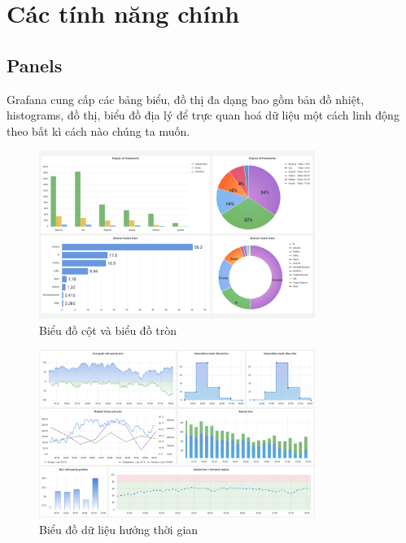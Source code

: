\section{Các tính năng chính}
\subsection{Panels}
Grafana cung cấp các bảng biểu, đồ thị đa dạng bao gồm bản đồ nhiệt, histograms, đồ thị, biểu đồ địa lý để trực quan hoá dữ liệu một cách linh động theo bất kì cách nào chúng ta muốn.
\begin{figure}[H] %
    \centering %
    \includegraphics[width=0.8\textwidth]{figures/bar_chart_and_pie_chart_light_theme_sized.png} 
    \caption{Biểu đồ cột và biểu đồ tròn} %
    \label{fig:fig_01}
\end{figure}
\begin{figure}[H] %
    \centering %
    \includegraphics[width=0.8\textwidth]{figures/time_series_light_theme_sized.png} 
    \caption{Biểu đồ dữ liệu hướng thời gian} %
    \label{fig:fig_01}
\end{figure}
